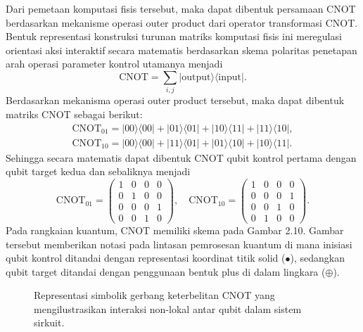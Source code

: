 Dari pemetaan komputasi fisis tersebut, maka dapat dibentuk persamaan CNOT berdasarkan mekanisme operasi outer product dari operator transformasi CNOT. Bentuk representasi konstruksi turunan matriks komputasi fisis ini meregulasi orientasi aksi interaktif secara matematis berdasarkan skema polaritas penetapan arah operasi parameter kontrol utamanya menjadi
\begin{equation}
    \label{eq:cnot_from_basis}
    \text{CNOT} = \sum_{i,j} |\text{output}\rangle\langle \text{input}|.
\end{equation}
Berdasarkan mekanisma operasi outer product tersebut, maka dapat dibentuk matriks CNOT sebagai berikut:
\begin{equation}
    \begin{split}
    \label{eq:cnot_matrix}
    \text{CNOT}_{01} = |00\rangle\langle00| + |01\rangle\langle01| + |10\rangle\langle11| + |11\rangle\langle10|, \\
    \text{CNOT}_{10} = |00\rangle\langle00| + |11\rangle\langle01| + |01\rangle\langle10| + |10\rangle\langle11|.
    \end{split}
\end{equation}
Sehingga secara matematis dapat dibentuk CNOT qubit kontrol pertama dengan qubit target kedua dan sebaliknya menjadi
\begin{equation}
    \label{eq:cnot_matrix_2}
    \text{CNOT}_{01} = \begin{pmatrix}
        1 & 0 & 0 & 0 \\
        0 & 1 & 0 & 0 \\
        0 & 0 & 0 & 1 \\
        0 & 0 & 1 & 0
    \end{pmatrix}, \quad
    \text{CNOT}_{10} = \begin{pmatrix}
        1 & 0 & 0 & 0 \\
        0 & 0 & 0 & 1 \\
        0 & 0 & 1 & 0 \\
        0 & 1 & 0 & 0
    \end{pmatrix}.
\end{equation}
Pada rangkaian kuantum, CNOT memiliki skema pada Gambar 2.10. Gambar tersebut memberikan notasi pada lintasan pemrosesan kuantum di mana inisiasi qubit kontrol ditandai dengan representasi koordinat titik solid ($\bullet$), sedangkan qubit target ditandai dengan penggunaan bentuk plus di dalam lingkara ($\oplus$).

\begin{figure}[htbp]
    \centering
    \caption{Representasi simbolik gerbang keterbelitan CNOT yang mengilustrasikan interaksi non-lokal antar qubit dalam sistem sirkuit.}
    \label{fig:gerbang_cnot}
\end{figure}


